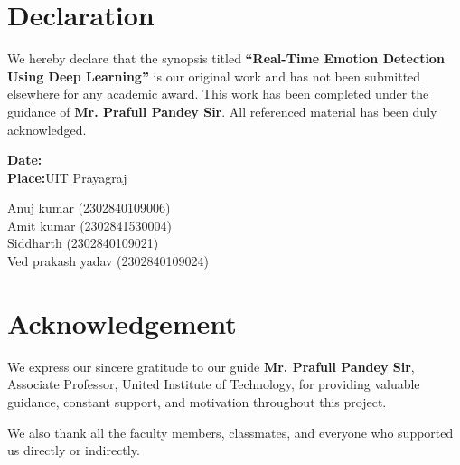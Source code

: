 \documentclass[12pt,a4paper]{report}
\begin{document}

\chapter*{\centering\textbf{Declaration}}
\vspace{1.0cm}

We hereby declare that the synopsis titled  
\textbf{“Real-Time Emotion Detection Using Deep Learning”}  
is our original work and has not been submitted elsewhere for any academic award.  
This work has been completed under the guidance of  
\textbf{Mr. Prafull Pandey Sir}.  
All referenced material has been duly acknowledged.

\vspace{1.2cm}

\noindent\textbf{Date:}\\
\noindent\textbf{Place:}\hspace{1cm}UIT Prayagraj

\vspace{1cm}
\begin{flushright}
Anuj kumar (2302840109006)\\
Amit kumar (2302841530004)\\
Siddharth (2302840109021)\\
Ved prakash yadav (2302840109024)
\end{flushright}

\clearpage


\chapter*{\centering\textbf{Acknowledgement}}
\vspace{1.0cm}

We express our sincere gratitude to our guide  
\textbf{Mr. Prafull Pandey Sir},  
Associate Professor, United Institute of Technology,  
for providing valuable guidance, constant support, and motivation throughout this project.

We also thank all the faculty members, classmates, and everyone who supported us directly or indirectly.
\end{document}
